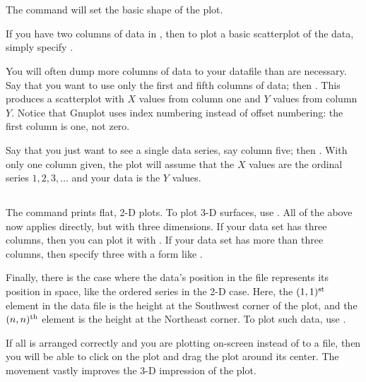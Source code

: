\section{} The  command will set the basic shape of
the plot. 

If you have two columns of data in , then to plot a basic
scatterplot of the data, simply specify . 

You will often dump more columns of data to your datafile than are
necessary. Say that you want to use only the first and fifth columns of
data; then . This produces a scatterplot
with $X$ values from column one and $Y$ values from column $Y$.
Notice that Gnuplot uses index numbering instead of offset numbering:
the first column is one, not zero.

Say that you just want to see a single data series, say column five; then 
. With only one column given, the plot will
assume that the $X$ values are the ordinal series $1, 2, 3, \dots$ and
your data is the $Y$ values.

\subsection{} The  command prints flat, 2-D plots.
To plot 3-D surfaces, use . All of the above now applies
directly, but with three dimensions. If your data set has three columns, then
you can plot it with . If your data set has more
than three columns, then specify three with a form like . 

Finally, there is the case where the data's  position in the file
represents its position in space, like the ordered series in the 2-D
case. Here, the $(1,1)^{\rm st}$ element in the data file is the
height at the Southwest corner of the plot, and the $(n,n)^{\rm th}$
element is the height at the Northeast corner. To plot such data, use
.

If all is arranged correctly and you are plotting on-screen instead of
to a file, then you will be able to click on the plot and drag the plot
around its center. The movement vastly improves the 3-D impression of the plot.

